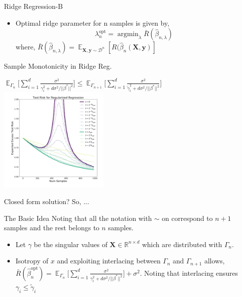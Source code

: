 \documentclass[aspectratio=169]{beamer}
\begin{document}
\begin{frame}{Ridge Regression-B}
  
  \begin{itemize}
    \item  Optimal ridge parameter for n samples is given by,
      \begin{equation}
        \lambda_n^{\text{opt}} = \displaystyle\mathop{\text{argmin}}_\lambda \bar{R}(\hat{\beta}_{n,\lambda})
      \end{equation}
where, $\bar{R}(\hat{\beta}_{n,\lambda}) = \displaystyle\mathop{\mathbb{E}}_{\boldsymbol{X},\boldsymbol{y}\sim \mathcal{D}^n}[R(\hat{\beta}_n(\boldsymbol{X},\boldsymbol{y})]$
    \end{itemize}
\end{frame}

\begin{frame}{Sample Monotonicity in Ridge Reg.}


 {\centering$\displaystyle\mathop{\mathbb{E}}_{\Gamma_n}\Bigg[\sum_{i=1}^d \frac{\sigma^2}{\gamma_i^2+d\sigma^2/||\beta^*||^2}\Bigg]\leq\displaystyle\mathop{\mathbb{E}}_{\Gamma_{n+1}}\Bigg[\sum_{i=1}^d \frac{\sigma^2}{\tilde{\gamma}_i^2+d\sigma^2/||\beta^*||^2}\Bigg]$ \includegraphics[width=0.4\textwidth]{Figures/ex1.png}}

 {Closed form solution? So, ...}
\begin{block}{\color{White} The Basic Idea}
Noting that all the notation with $\sim$ on correspond to $n+1$ samples and the rest belongs to $n$ samples.
\begin{itemize}
  \item <1> Let $\gamma$ be the singular values of $\boldsymbol{X}\in\mathbb{R}^{n\times d}$ which are distributed with $\Gamma_n$.
  \item <1> Isotropy of $x$ and exploiting interlacing between $\Gamma_n$ and $\Gamma_{n+1}$ allows, $\bar{R}(\hat{\beta}_{n}^{\text{opt}})=\displaystyle\mathop{\mathbb{E}}_{\Gamma_n}\Bigg[\sum_{i=1}^d \frac{\sigma^2}{\gamma_i^2+d\sigma^2/||\beta^*||^2}\Bigg]+\sigma^2$. Noting that interlacing ensures $\gamma_i\leq \tilde{\gamma}_i$
\end{itemize} 
\end{block}


\end{frame}
\end{document}
